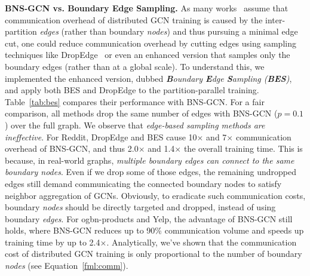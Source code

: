 \documentclass{article}
\newcommand{\niparagraph}[1]{\noindent\textbf{#1}}
\begin{document}
\niparagraph{BNS-GCN vs. Boundary Edge Sampling.}
\label{sec:compare_edge_sampling}
As many works~\citep{zhu2019aligraph,zheng2020distdgl,fey2021gnnautoscale} assume that communication overhead of distributed GCN training is caused by the inter-partition \textit{edges} (rather than boundary \textit{nodes}) and thus pursuing a minimal edge cut, one could reduce communication overhead by cutting edges using sampling techniques like DropEdge~\citep{rong2019dropedge} or even an enhanced version that samples only the boundary edges (rather than at a global scale).
To understand this, we implemented the enhanced version, dubbed \textit{\textbf{B}oundary \textbf{E}dge \textbf{S}ampling (\textbf{BES})}, and apply both BES and DropEdge to the partition-parallel training.
Table~\ref{tab:bes} compares their performance with BNS-GCN. 
For a fair comparison, all methods drop the same number of edges with BNS-GCN ($p=0.1$) over the full graph.
We observe that \textit{edge-based sampling methods are ineffective}.
For Reddit, DropEdge and BES cause 10$\times$ and 7$\times$ communication overhead of BNS-GCN, and thus 2.0$\times$ and 1.4$\times$ the overall training time.
This is because, in real-world graphs, \textit{multiple boundary edges can connect to the same boundary nodes}.
Even if we drop some of those edges, the remaining undropped edges still demand communicating the connected boundary nodes to satisfy neighbor aggregation of GCNs. 
Obviously, to eradicate such communication costs, boundary \textit{nodes} should be directly targeted and dropped, instead of using boundary \textit{edges}. 
For ogbn-products and Yelp, the advantage of BNS-GCN still holds, where BNS-GCN reduces up to 90\% communication volume and speeds up training time by up to 2.4$\times$.
Analytically, we've shown that the communication cost of distributed GCN training is only proportional to the number of boundary \textit{nodes} (see Equation~\ref{fml:comm}).
\end{document}
